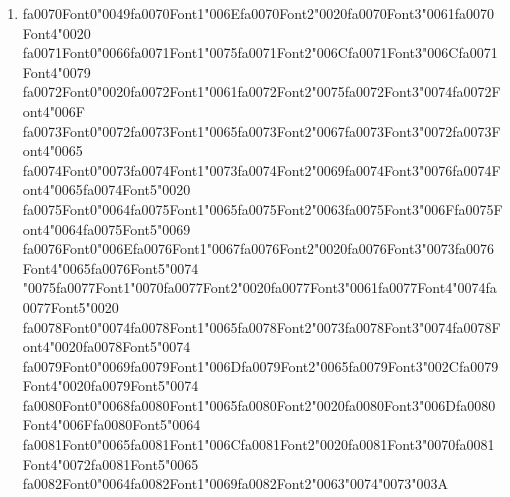 \documentclass[11pt]{article}
\begin{document}
\begin{enumerate}[label=Q\arabic*., leftmargin=*]
\item {\csname fa0070Font0\endcsname\char"0049}{\csname fa0070Font1\endcsname\char"006E}{\csname fa0070Font2\endcsname\char"0020}{\csname fa0070Font3\endcsname\char"0061}{\csname fa0070Font4\endcsname\char"0020} {\csname fa0071Font0\endcsname\char"0066}{\csname fa0071Font1\endcsname\char"0075}{\csname fa0071Font2\endcsname\char"006C}{\csname fa0071Font3\endcsname\char"006C}{\csname fa0071Font4\endcsname\char"0079} {\csname fa0072Font0\endcsname\char"0020}{\csname fa0072Font1\endcsname\char"0061}{\csname fa0072Font2\endcsname\char"0075}{\csname fa0072Font3\endcsname\char"0074}{\csname fa0072Font4\endcsname\char"006F} {\csname fa0073Font0\endcsname\char"0072}{\csname fa0073Font1\endcsname\char"0065}{\csname fa0073Font2\endcsname\char"0067}{\csname fa0073Font3\endcsname\char"0072}{\csname fa0073Font4\endcsname\char"0065} {\csname fa0074Font0\endcsname\char"0073}{\csname fa0074Font1\endcsname\char"0073}{\csname fa0074Font2\endcsname\char"0069}{\csname fa0074Font3\endcsname\char"0076}{\csname fa0074Font4\endcsname\char"0065}{\csname fa0074Font5\endcsname\char"0020} {\csname fa0075Font0\endcsname\char"0064}{\csname fa0075Font1\endcsname\char"0065}{\csname fa0075Font2\endcsname\char"0063}{\csname fa0075Font3\endcsname\char"006F}{\csname fa0075Font4\endcsname\char"0064}{\csname fa0075Font5\endcsname\char"0069} {\csname fa0076Font0\endcsname\char"006E}{\csname fa0076Font1\endcsname\char"0067}{\csname fa0076Font2\endcsname\char"0020}{\csname fa0076Font3\endcsname\char"0073}{\csname fa0076Font4\endcsname\char"0065}{\csname fa0076Font5\endcsname\char"0074} {\char"0075}{\csname fa0077Font1\endcsname\char"0070}{\csname fa0077Font2\endcsname\char"0020}{\csname fa0077Font3\endcsname\char"0061}{\csname fa0077Font4\endcsname\char"0074}{\csname fa0077Font5\endcsname\char"0020} {\csname fa0078Font0\endcsname\char"0074}{\csname fa0078Font1\endcsname\char"0065}{\csname fa0078Font2\endcsname\char"0073}{\csname fa0078Font3\endcsname\char"0074}{\csname fa0078Font4\endcsname\char"0020}{\csname fa0078Font5\endcsname\char"0074} {\csname fa0079Font0\endcsname\char"0069}{\csname fa0079Font1\endcsname\char"006D}{\csname fa0079Font2\endcsname\char"0065}{\csname fa0079Font3\endcsname\char"002C}{\csname fa0079Font4\endcsname\char"0020}{\csname fa0079Font5\endcsname\char"0074} {\csname fa0080Font0\endcsname\char"0068}{\csname fa0080Font1\endcsname\char"0065}{\csname fa0080Font2\endcsname\char"0020}{\csname fa0080Font3\endcsname\char"006D}{\csname fa0080Font4\endcsname\char"006F}{\csname fa0080Font5\endcsname\char"0064} {\csname fa0081Font0\endcsname\char"0065}{\csname fa0081Font1\endcsname\char"006C}{\csname fa0081Font2\endcsname\char"0020}{\csname fa0081Font3\endcsname\char"0070}{\csname fa0081Font4\endcsname\char"0072}{\csname fa0081Font5\endcsname\char"0065} {\csname fa0082Font0\endcsname\char"0064}{\csname fa0082Font1\endcsname\char"0069}{\csname fa0082Font2\endcsname\char"0063}{\char"0074}{\char"0073}{\char"003A}


\end{enumerate}
\end{document}
